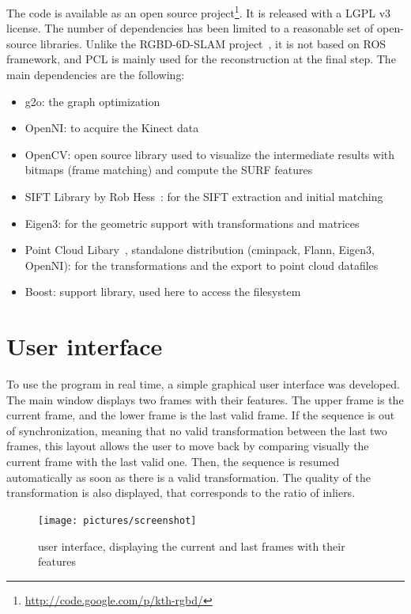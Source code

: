 The code is available as an open source project\footnote{\url{http://code.google.com/p/kth-rgbd/}}. It is released with a LGPL v3 license. The number of dependencies has been limited to a reasonable set of open-source libraries. Unlike the RGBD-6D-SLAM project~\cite{engelhard11euron-workshop}, it is not based on \gls{ROS} framework, and \gls{PCL} is mainly used for the reconstruction at the final step. The main dependencies are the following:
\begin{itemize}
\item g2o: the graph optimization
\item OpenNI: to acquire the Kinect data
\item OpenCV: open source library used to visualize the intermediate results with bitmaps (frame matching) and compute the \gls {SURF} features
\item SIFT Library by Rob Hess~\cite{hess_sift}: for the \gls{SIFT} extraction and initial matching
\item Eigen3: for the geometric support with transformations and matrices
\item Point Cloud Libary~\cite{Rusu_ICRA2011_PCL}, standalone distribution (cminpack, Flann, Eigen3, OpenNI): for the transformations and the export to point cloud datafiles
\item Boost: support library, used here to access the filesystem
\end{itemize}

\clearpage
\section{User interface}
To use the program in real time, a simple graphical user interface was developed. The main window displays two frames with their features. The upper frame is the current frame, and the lower frame is the last valid frame. If the sequence is out of synchronization, meaning that no valid transformation between the last two frames, this layout allows the user to move back by comparing visually the current frame with the last valid one. Then, the sequence is resumed automatically as soon as there is a valid transformation. The quality of the transformation is also displayed, that corresponds to the ratio of inliers.

\begin{figure}[H]
\centering
\texttt{[image: pictures/screenshot]}\\
\caption{user interface, displaying the current and last frames with their features}
\end{figure}

